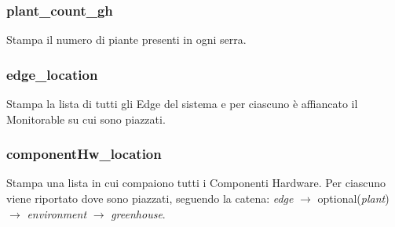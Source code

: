 \subsubsection{plant\_count\_gh}
Stampa il numero di piante presenti in ogni serra.

\subsubsection{edge\_location}
Stampa la lista di tutti gli Edge del sistema e per ciascuno è affiancato il Monitorable su cui sono piazzati.

\subsubsection{componentHw\_location}
Stampa una lista in cui compaiono tutti i Componenti Hardware. Per ciascuno viene riportato dove sono piazzati, seguendo la catena: \textit{edge} $\rightarrow$ optional(\textit{plant}) $\rightarrow$ \textit{environment} $\rightarrow$ \textit{greenhouse}.
